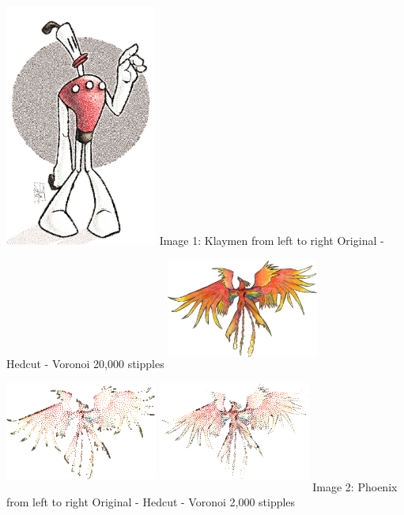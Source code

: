\documentclass[11pt]{article}
\begin{document}
\includegraphics[width=5cm, height=8cm]{klaymen-voronoi-20000.png}
\newline Image 1: Klaymen from left to right Original - Hedcut - Voronoi 20,000 stipples 
\newline 
\newline\includegraphics[width=5cm, height=4cm]{phoenix.png} 
\includegraphics[width=5cm, height=4cm]{phoenix-hedcut-2000.png}
\includegraphics[width=5cm, height=4cm]{phoenix-voronoi-2000.png}
\newline Image 2: Phoenix from left to right Original - Hedcut - Voronoi 2,000 stipples
\end{document}
